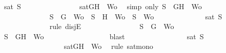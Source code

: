 \begin{isabellebody}
\ {\isachardoublequoteopen}sat\ S{\isacharprime}{\isachardoublequoteclose}\isanewline
\ \ \ \ \ \ \ \ \ \ \ \ \ \ \isamarkupfalse%
\ {\isacartoucheopen}sat{\isacharparenleft}{\isacharbraceleft}G{\isacharcomma}H{\isacharbraceright}\ {\isasymunion}\ Wo{\isacharprime}{\isacharparenright}{\isacartoucheclose}\ \isamarkupfalse%
\ {\isacharparenleft}simp\ only{\isacharcolon}\ {\isacartoucheopen}S{\isacharprime}\ {\isacharequal}\ {\isacharbraceleft}G{\isacharcomma}H{\isacharbraceright}\ {\isasymunion}\ Wo{\isacharprime}{\isacartoucheclose}{\isacharparenright}\isanewline
\ \ \ \ \ \ \ \ \ \ \isamarkupfalse%
\isanewline
\ \ \ \ \ \ \ \ \ \ \ \ \isamarkupfalse%
\ {\isachardoublequoteopen}S{\isacharprime}\ {\isacharequal}\ {\isacharbraceleft}G{\isacharbraceright}\ {\isasymunion}\ Wo{\isacharprime}\ {\isasymor}\ S{\isacharprime}\ {\isacharequal}\ {\isacharbraceleft}H{\isacharbraceright}\ {\isasymunion}\ Wo{\isacharprime}\ {\isasymor}\ S{\isacharprime}\ {\isacharequal}\ Wo{\isacharprime}{\isachardoublequoteclose}\isanewline
\ \ \ \ \ \ \ \ \ \ \ \ \isamarkupfalse%
\ {\isachardoublequoteopen}sat\ S{\isacharprime}{\isachardoublequoteclose}\isanewline
\ \ \ \ \ \ \ \ \ \ \ \ \isamarkupfalse%
\ {\isacharparenleft}rule\ disjE{\isacharparenright}\isanewline
\ \ \ \ \ \ \ \ \ \ \ \ \ \ \isamarkupfalse%
\ {\isachardoublequoteopen}S{\isacharprime}\ {\isacharequal}\ {\isacharbraceleft}G{\isacharbraceright}\ {\isasymunion}\ Wo{\isacharprime}{\isachardoublequoteclose}\isanewline
\ \ \ \ \ \ \ \ \ \ \ \ \ \ \isamarkupfalse%
\ \isamarkupfalse%
\ {\isachardoublequoteopen}S{\isacharprime}\ {\isasymsubseteq}\ {\isacharbraceleft}G{\isacharcomma}H{\isacharbraceright}\ {\isasymunion}\ Wo{\isacharprime}{\isachardoublequoteclose}\isanewline
\ \ \ \ \ \ \ \ \ \ \ \ \ \ \ \ \isamarkupfalse%
\ blast\ \isanewline
\ \ \ \ \ \ \ \ \ \ \ \ \ \ \isamarkupfalse%
\ {\isachardoublequoteopen}sat\ S{\isacharprime}{\isachardoublequoteclose}\isanewline
\ \ \ \ \ \ \ \ \ \ \ \ \ \ \ \ \isamarkupfalse%
\ {\isacartoucheopen}sat{\isacharparenleft}{\isacharbraceleft}G{\isacharcomma}H{\isacharbraceright}\ {\isasymunion}\ Wo{\isacharprime}{\isacharparenright}{\isacartoucheclose}\ \isamarkupfalse%
\ {\isacharparenleft}rule\ sat{\isacharunderscore}mono{\isacharparenright}\isanewline
\ \ \ \ \ \ \ \ \ \ \ \ \isamarkupfalse%
\isanewline
\ \ \ \ \ \ \ \ \ \ \ \ \ \ \isamarkupfalse%

\end{isabellebody}
